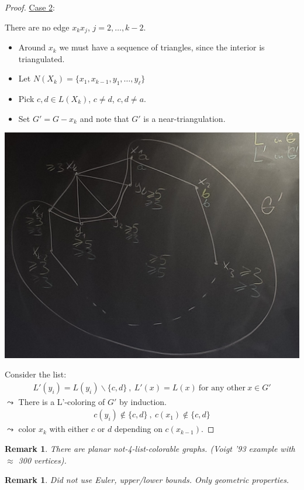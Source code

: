 \documentclass[a4paper]{article}
\theoremstyle{plain}
\theoremstyle{myremark}
\newtheorem{remark}[lemma]{Remark}
\begin{document}
\begin{proof}
\underline{Case 2}:

There are no edge $x_k x_j$, $j=2,\ldots,k-2$.
\begin{itemize}
\item Around $x_k$ we must have a sequence of triangles, since the interior is triangulated.
\item Let $N(X_k)=\{x_1,x_{k-1},y_1,\ldots,y_{\ell}\}$
\item Pick $c,d \in L(X_k)$, $c\neq d$, $c,d \neq a$.
\item Set $G'=G-x_k$ and note that $G' $ is a near-triangulation. 
\end{itemize}
\begin{center}
\includegraphics[scale=0.125]{Case2}
\end{center}
Consider the list:
\begin{align*}
L'(y_i)=L(y_i)\backslash \{c,d\} \ , \ L'(x)=L(x) \ \text{for any other} \ x \in G'
\end{align*}
$\leadsto$ There is a L'-coloring of $G'$ by induction.
\begin{align*}
c(y_i)\notin \{c,d\} \ , \ c(x_1) \notin \{c,d\}
\end{align*}
$\leadsto$ color $x_k$ with either $c$ or $d$ depending on $c(x_{k-1})$.
\end{proof}

\begin{remark}
There are planar not-4-list-colorable graphs. (Voigt '93 example with $\approx$ 300 vertices).
\end{remark}
\begin{remark}
Did not use Euler, upper/lower bounds. Only geometric properties.
\end{remark}
\end{document}
